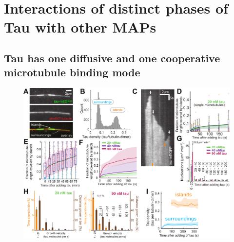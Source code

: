 \section{Interactions of distinct phases of Tau with other MAPs}
\label{sec:Tau}
\subsection{Tau has one diffusive and one cooperative microtubule binding mode}
\begin{figure}[b!]
\centering
\includegraphics[width=1\linewidth]{Figures/TauGROW.png}
\end{figure}
